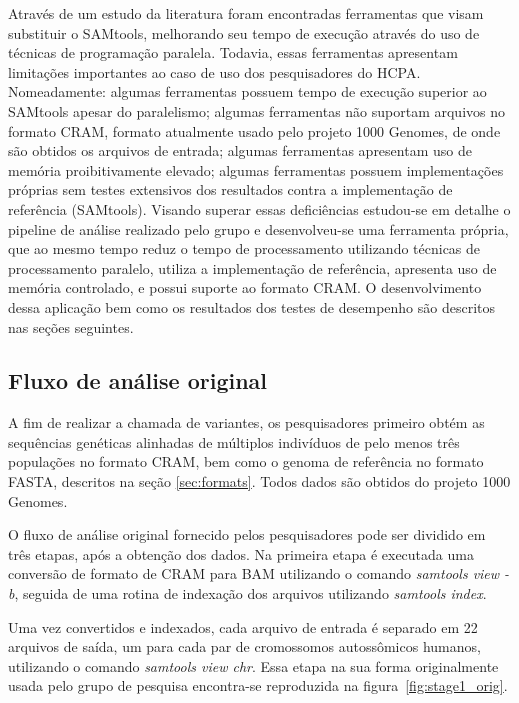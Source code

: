 \documentclass[cic,tc]{iiufrgs}
\begin{document}
Através de um estudo da literatura foram encontradas ferramentas que visam
substituir o SAMtools, melhorando seu tempo de execução através do uso de
técnicas de programação paralela. Todavia, essas ferramentas apresentam
limitações importantes ao caso de uso dos pesquisadores do HCPA. Nomeadamente:
algumas ferramentas possuem tempo de execução superior ao SAMtools apesar do
paralelismo; algumas ferramentas não suportam arquivos no formato CRAM, formato
atualmente usado pelo projeto 1000 Genomes, de onde são obtidos os arquivos de
entrada; algumas ferramentas apresentam uso de memória proibitivamente elevado;
algumas ferramentas possuem implementações próprias sem testes extensivos dos
resultados contra a implementação de referência (SAMtools). Visando superar
essas deficiências estudou-se em detalhe o pipeline de análise realizado pelo
grupo e desenvolveu-se uma ferramenta própria, que ao mesmo tempo reduz o tempo
de processamento utilizando técnicas de processamento paralelo, utiliza a
implementação de referência, apresenta uso de memória controlado, e possui
suporte ao formato CRAM. O desenvolvimento dessa aplicação bem como os
resultados dos testes de desempenho são descritos nas seções seguintes.

\subsection{Fluxo de análise original}

A fim de realizar a chamada de variantes, os pesquisadores primeiro obtém as
sequências genéticas alinhadas de múltiplos indivíduos de pelo menos três
populações no formato CRAM, bem como o genoma de referência no formato FASTA,
descritos na seção \ref{sec:formats}. Todos dados são obtidos do projeto 1000
Genomes.

O fluxo de análise original fornecido pelos pesquisadores pode ser dividido em
três etapas, após a obtenção dos dados. Na primeira etapa é executada uma
conversão de formato de CRAM para BAM utilizando o comando \textit{samtools
view -b}, seguida de uma rotina de indexação dos arquivos utilizando
\textit{samtools index}.

Uma vez convertidos e indexados, cada arquivo de entrada é separado em 22
arquivos de saída, um para cada par de cromossomos autossômicos humanos,
utilizando o comando \textit{samtools view chr}. Essa etapa na sua forma
originalmente usada pelo grupo de pesquisa encontra-se reproduzida na
figura~\ref{fig:stage1_orig}.
\end{document}
